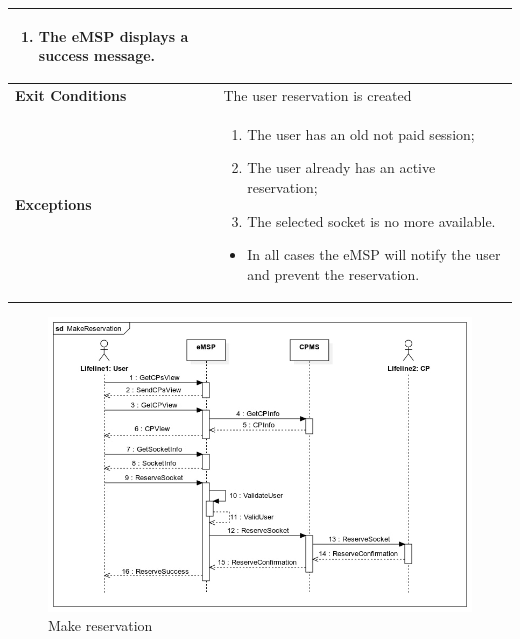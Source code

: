 \documentclass{Configuration_Files/PoliMi3i_thesis}
\begin{document}
\begin{table}[H]
\begin{xltabular}{\textwidth}{| >{}l | X |}
\begin{enumerate}
        \item The eMSP displays a success message.
        \end{enumerate}\B\\
    \hline
    \textbf{Exit Conditions} & The user reservation is created\B\\
    \hline
    \textbf{Exceptions} & \begin{enumerate}
        \item The user has an old not paid session;
        \item The user already has an active reservation;
        \item The selected socket is no more available.
    \end{enumerate}
    \begin{itemize}
        \item In all cases the eMSP will notify the user and prevent the reservation.
    \end{itemize}\B\\
    \hline
    \end{xltabular}
\end{table}

\begin{figure}[H]
    \centering
    \includegraphics[width=1\textwidth]{Images/UseCases/MakeReservation.jpg}
    \caption{Make reservation}
\end{figure}

\end{document}
